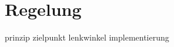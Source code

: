 \chapter{Regelung \dcfirstauthorshort}
\label{cha:regelung}

{prinzip}
{zielpunkt}
{lenkwinkel}
{implementierung}

